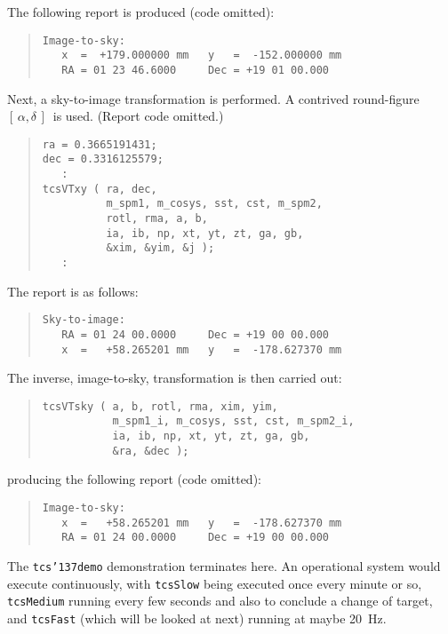 \documentclass[12pt,fleqn,twoside]{article}
\renewcommand{\_}{{\tt\char'137}}     %
\newcommand{\radec}     {$[\,\alpha,\delta\,]$}
\begin{document}
The following report is produced (code omitted):
\begin{quote}
\begin{small}
\begin{verbatim}
Image-to-sky:
   x  =  +179.000000 mm   y   =  -152.000000 mm
   RA = 01 23 46.6000     Dec = +19 01 00.000
\end{verbatim}\end{small}
\end{quote}
Next, a sky-to-image transformation is performed.  A
contrived round-figure \radec\ is used. (Report code
omitted.)
\begin{quote}
\begin{small}
\begin{verbatim}
ra = 0.3665191431;
dec = 0.3316125579;
   :
tcsVTxy ( ra, dec,
          m_spm1, m_cosys, sst, cst, m_spm2,
          rotl, rma, a, b,
          ia, ib, np, xt, yt, zt, ga, gb,
          &xim, &yim, &j );
   :
\end{verbatim}\end{small}
\end{quote}
The report is as follows:
\begin{quote}
\begin{small}
\begin{verbatim}
Sky-to-image:
   RA = 01 24 00.0000     Dec = +19 00 00.000
   x  =   +58.265201 mm   y   =  -178.627370 mm
\end{verbatim}\end{small}
\end{quote}
The inverse, image-to-sky, transformation is then carried out:
\begin{quote}
\begin{small}
\begin{verbatim}
tcsVTsky ( a, b, rotl, rma, xim, yim,
           m_spm1_i, m_cosys, sst, cst, m_spm2_i,
           ia, ib, np, xt, yt, zt, ga, gb,
           &ra, &dec );
\end{verbatim}\end{small}
\end{quote}
producing the following report (code omitted):
\begin{quote}
\begin{small}
\begin{verbatim}
Image-to-sky:
   x  =   +58.265201 mm   y   =  -178.627370 mm
   RA = 01 24 00.0000     Dec = +19 00 00.000
\end{verbatim}\end{small}
\end{quote}
The {\tt tcs\_demo} demonstration terminates here.
An operational system would
execute continuously, with {\tt tcsSlow} being executed once every minute or
so, {\tt tcsMedium} running every few seconds and also to conclude a change
of target, and {\tt tcsFast} (which will be looked at
next) running at maybe 20~Hz.
\end{document}
